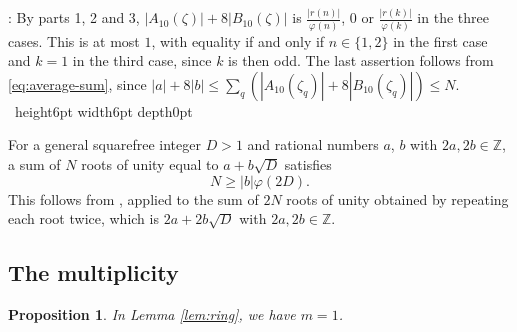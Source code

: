 \documentclass[leqno]{article}
\newcommand{\Z}{\ensuremath{\mathbb{Z}}}
\renewcommand{\leq}{\ensuremath{\leqslant}}
\renewcommand{\geq}{\ensuremath{\geqslant}}
\newcommand{\qed}{\hfill \vrule height6pt  width6pt depth0pt}
\newtheorem{prop}[thm]{Proposition}
\newenvironment{proof}[1][]{\noindent {\it Proof #1} : }{\hbox{~}\qed
\smallskip
}
\numberwithin{equation}{section}
\begin{document}
\begin{proof}
By parts 1, 2 and 3, $|A_{10}(\zeta)|+8|B_{10}(\zeta)|$ is $\frac{|r(n)|}{\varphi(n)}$, $0$ or $\frac{|r(k)|}{\varphi(k)}$ in the three cases. This is at most $1$, with equality if and only if $n \in \{1,2\}$ in the first case and $k = 1$ in the third case, since $k$ is then odd. The last assertion follows from \eqref{eq:average-sum}, since $|a|+8|b| \leq \sum_q(|A_{10}(\zeta_q)|+8|B_{10}(\zeta_q)|) \leq N$.
\end{proof}

For a general squarefree integer $D > 1$ and rational numbers $a$, $b$ with $2a, 2b \in \Z$, a sum of $N$ roots of unity equal to $a+b\sqrt D$ satisfies
\begin{equation}
\label{eq:larson}
N \geq |b|\varphi(2D).
\end{equation}
This follows from \cite[Theorem 1.3 p.~2 and Theorem 6.2 p.~18]{Lar14}, applied to the sum of $2N$ roots of unity obtained by repeating each root twice, which is $2a+2b\sqrt D$ with $2a, 2b \in \Z$.

\subsection{The multiplicity}
\label{subsec:multiplicity}

\begin{prop}
\label{prop:m-equals-one}
In Lemma \ref{lem:ring}, we have $m = 1$.
\end{prop}
\end{document}
